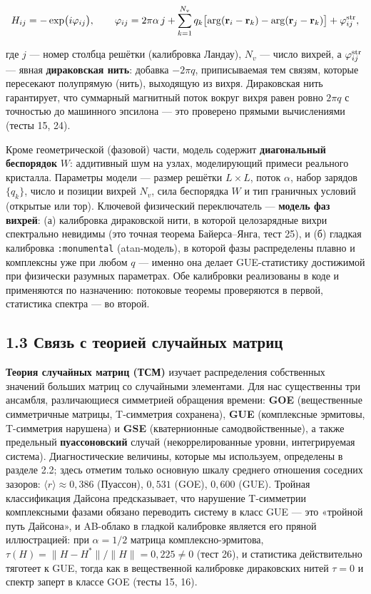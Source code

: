 \documentclass[
]{article}
\begin{document}
\[H_{ij} = -\exp\bigl(i\varphi_{ij}\bigr),\qquad \varphi_{ij} = 2\pi\alpha\,j + \sum_{k=1}^{N_v} q_k\bigl[\arg(\mathbf r_i - \mathbf r_k) - \arg(\mathbf r_j - \mathbf r_k)\bigr] + \varphi^{\rm str}_{ij},\]

где \(j\) --- номер столбца решётки (калибровка Ландау), \(N_v\) ---
число вихрей, а \(\varphi^{\rm str}_{ij}\) --- явная \textbf{дираковская
нить}: добавка \(-2\pi q\), приписываемая тем связям, которые пересекают
полупрямую (нить), выходящую из вихря. Дираковская нить гарантирует, что
суммарный магнитный поток вокруг вихря равен ровно \(2\pi q\) с
точностью до машинного эпсилона --- это проверено прямыми вычислениями
(тесты 15, 24).

Кроме геометрической (фазовой) части, модель содержит
\textbf{диагональный беспорядок} \(W\): аддитивный шум на узлах,
моделирующий примеси реального кристалла. Параметры модели --- размер
решётки \(L\times L\), поток \(\alpha\), набор зарядов \(\{q_k\}\),
число и позиции вихрей \(N_v\), сила беспорядка \(W\) и тип граничных
условий (открытые или тор). Ключевой физический переключатель ---
\textbf{модель фаз вихрей}: (а) калибровка дираковской нити, в которой
целозарядные вихри спектрально невидимы (это точная теорема
Байерса--Янга, тест 25), и (б) гладкая калибровка \texttt{:monumental}
(atan-модель), в которой фазы распределены плавно и комплексны уже при
любом \(q\) --- именно она делает GUE-статистику достижимой при
физически разумных параметрах. Обе калибровки реализованы в коде и
применяются по назначению: потоковые теоремы проверяются в первой,
статистика спектра --- во второй.

\subsection{1.3 Связь с теорией случайных
матриц}\label{ux441ux432ux44fux437ux44c-ux441-ux442ux435ux43eux440ux438ux435ux439-ux441ux43bux443ux447ux430ux439ux43dux44bux445-ux43cux430ux442ux440ux438ux446}

\textbf{Теория случайных матриц (ТСМ)} изучает распределения собственных
значений больших матриц со случайными элементами. Для нас существенны
три ансамбля, различающиеся симметрией обращения времени: \textbf{GOE}
(вещественные симметричные матрицы, T-симметрия сохранена), \textbf{GUE}
(комплексные эрмитовы, T-симметрия нарушена) и \textbf{GSE}
(кватернионные самодвойственные), а также предельный
\textbf{пуассоновский} случай (некоррелированные уровни, интегрируемая
система). Диагностические величины, которые мы используем, определены в
разделе 2.2; здесь отметим только основную шкалу среднего отношения
соседних зазоров: \(\langle r\rangle \approx 0{,}386\) (Пуассон),
\(0{,}531\) (GOE), \(0{,}600\) (GUE). Тройная классификация Дайсона
предсказывает, что нарушение T-симметрии комплексными фазами обязано
переводить систему в класс GUE --- это «тройной путь Дайсона», и
AB-облако в гладкой калибровке является его пряной иллюстрацией: при
\(\alpha=1/2\) матрица комплексно-эрмитова,
\(\tau(H) = \|H-H^*\|/\|H\| = 0{,}225\neq 0\) (тест 26), и статистика
действительно тяготеет к GUE, тогда как в вещественной калибровке
дираковских нитей \(\tau = 0\) и спектр заперт в классе GOE (тесты 15,
16).
\end{document}
